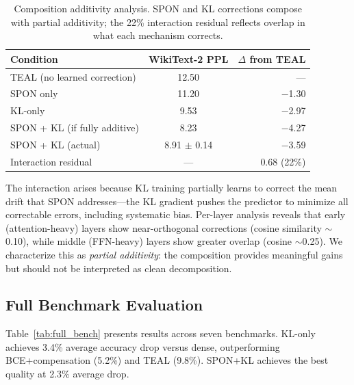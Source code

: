 \documentclass[11pt]{article}
\begin{document}
\begin{table}[t]
\centering
\caption{Composition additivity analysis. SPON and KL corrections compose with partial additivity; the 22\% interaction residual reflects overlap in what each mechanism corrects.}
\label{tab:composition}
\small
\begin{tabular}{lcr}
\toprule
Condition & WikiText-2 PPL & $\Delta$ from TEAL \\
\midrule
TEAL (no learned correction) & 12.50 & --- \\
SPON only & 11.20 & $-$1.30 \\
KL-only & 9.53 & $-$2.97 \\
SPON + KL (if fully additive) & 8.23 & $-$4.27 \\
SPON + KL (actual) & 8.91 $\pm$ 0.14 & $-$3.59 \\
\midrule
Interaction residual & --- & 0.68 (22\%) \\
\bottomrule
\end{tabular}
\end{table}

The interaction arises because KL training partially learns to correct the mean drift that SPON addresses---the KL gradient pushes the predictor to minimize all correctable errors, including systematic bias. Per-layer analysis reveals that early (attention-heavy) layers show near-orthogonal corrections (cosine similarity ${\sim}$0.10), while middle (FFN-heavy) layers show greater overlap (cosine ${\sim}$0.25). We characterize this as \emph{partial additivity}: the composition provides meaningful gains but should not be interpreted as clean decomposition.


\subsection{Full Benchmark Evaluation}
\label{sec:full_eval}

Table~\ref{tab:full_bench} presents results across seven benchmarks. KL-only achieves 3.4\% average accuracy drop versus dense, outperforming BCE+compensation (5.2\%) and TEAL (9.8\%). SPON+KL achieves the best quality at 2.3\% average drop.
\end{document}
